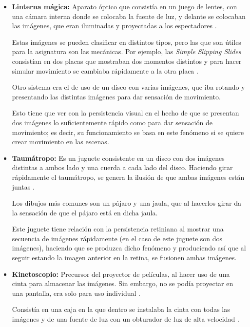 \documentclass{article}
\begin{document}
\begin{itemize}
    \item \textbf{Linterna mágica: }Aparato óptico que consistía en un juego de lentes, con una cámara interna donde se colocaba la fuente de luz, y delante se colocaban las imágenes, que eran iluminadas y proyectadas a los espectadores \cite{magiclantern}.
    
    Estas imágenes se pueden clasificar en distintos tipos, pero las que son útiles para la asignatura son las mecánicas. Por ejemplo, las \textit{Simple Slipping Slides} consistían en dos placas que mostraban dos momentos distintos y para hacer simular movimiento se cambiaba rápidamente a la otra placa \cite{magiclantern}.


    Otro sistema era el de uso de un disco con varias imágenes, que iba rotando y presentando las distintas imágenes para dar sensación de movimiento.

    Esto tiene que ver con la persistencia visual en el hecho de que se presentan dos imágenes lo suficientemente rápido como para dar sensación de movimiento; es decir, su funcionamiento se basa en este fenómeno si se quiere crear movimiento en las escenas.

    \item \textbf{Taumátropo: }Es un juguete consistente en un disco con dos imágenes distintas a ambos lado y una cuerda a cada lado del disco. Haciendo girar rápidamente el taumátropo, se genera la ilusión de que ambas imágenes están juntas \cite{tauma}.
    
    Los dibujos más comunes son un pájaro y una jaula, que al hacerlos girar da la sensación de que el pájaro está en dicha jaula.

    Este juguete tiene relación con la persistencia retiniana al mostrar una secuencia de imágenes rápidamente (en el caso de este juguete son dos imágenes), haciendo que se produzca dicho fenómeno y produciendo así que al seguir estando la imagen anterior en la retina, se fusionen ambas imágenes.

    \item \textbf{Kinetoscopio: }Precursor del proyector de películas, al hacer uso de una cinta para almacenar las imágenes. Sin embargo, no se podía proyectar en una pantalla, era solo para uso individual \cite{kinet}.
    
    Consistía en una caja en la que dentro se instalaba la cinta con todas las imágenes y de una fuente de luz con un obturador de luz de alta velocidad \cite{kinet}.


\end{itemize}
\end{document}
